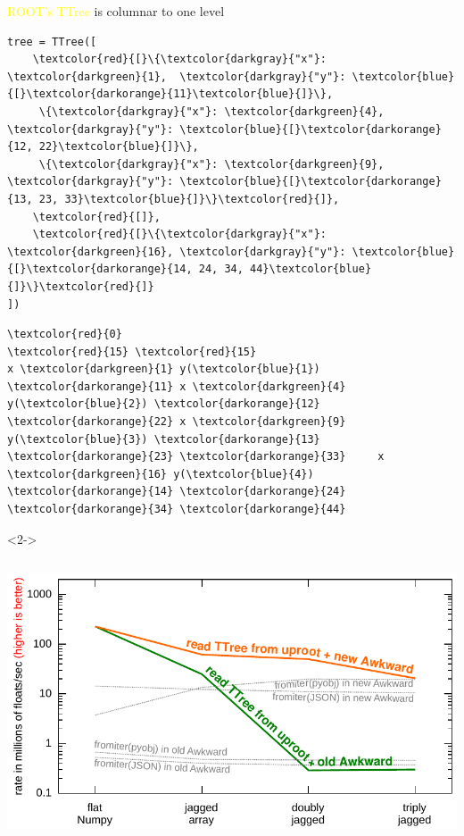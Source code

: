 \documentclass[aspectratio=169]{beamer}
\begin{document}
\begin{frame}[fragile]{\textcolor{yellow}{ROOT's TTree} is columnar to one level}
\small

\begin{Verbatim}[commandchars=\\\{\}]
tree = TTree([
    \textcolor{red}{[}\{\textcolor{darkgray}{"x"}: \textcolor{darkgreen}{1},  \textcolor{darkgray}{"y"}: \textcolor{blue}{[}\textcolor{darkorange}{11}\textcolor{blue}{]}\},
     \{\textcolor{darkgray}{"x"}: \textcolor{darkgreen}{4},  \textcolor{darkgray}{"y"}: \textcolor{blue}{[}\textcolor{darkorange}{12, 22}\textcolor{blue}{]}\},
     \{\textcolor{darkgray}{"x"}: \textcolor{darkgreen}{9},  \textcolor{darkgray}{"y"}: \textcolor{blue}{[}\textcolor{darkorange}{13, 23, 33}\textcolor{blue}{]}\}\textcolor{red}{]},
    \textcolor{red}{[]},
    \textcolor{red}{[}\{\textcolor{darkgray}{"x"}: \textcolor{darkgreen}{16}, \textcolor{darkgray}{"y"}: \textcolor{blue}{[}\textcolor{darkorange}{14, 24, 34, 44}\textcolor{blue}{]}\}\textcolor{red}{]}
])
\end{Verbatim}

\begin{Verbatim}[commandchars=\\\{\}]
\textcolor{red}{0}                                            \textcolor{red}{15} \textcolor{red}{15}
x \textcolor{darkgreen}{1} y(\textcolor{blue}{1}) \textcolor{darkorange}{11} x \textcolor{darkgreen}{4} y(\textcolor{blue}{2}) \textcolor{darkorange}{12} \textcolor{darkorange}{22} x \textcolor{darkgreen}{9} y(\textcolor{blue}{3}) \textcolor{darkorange}{13} \textcolor{darkorange}{23} \textcolor{darkorange}{33}     x \textcolor{darkgreen}{16} y(\textcolor{blue}{4}) \textcolor{darkorange}{14} \textcolor{darkorange}{24} \textcolor{darkorange}{34} \textcolor{darkorange}{44}
\end{Verbatim}

\vspace{0.1 cm}
\begin{uncoverenv}<2->
\begin{columns}
\includegraphics[width=\linewidth]{img/read_ttree-no-rntuple.pdf}


\end{columns}
\end{uncoverenv}
\end{frame}
\end{document}
